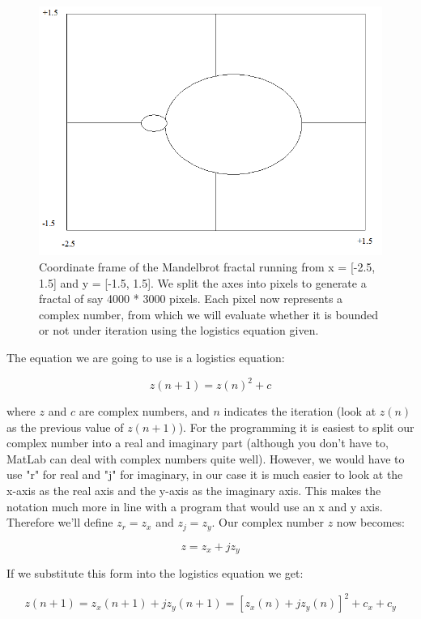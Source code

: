 \documentclass[12pt,letterpaper]{article}
\begin{document}
\begin{figure}
\centering
\includegraphics[width=0.7\linewidth]{HW_MandelbrotFractalCoordinates}
\caption{Coordinate frame of the Mandelbrot fractal running from x = [-2.5, 1.5] and y = [-1.5, 1.5]. We split the axes into pixels to generate a fractal of say 4000 * 3000 pixels. Each pixel now represents a complex number, from which we will evaluate whether it is bounded or not under iteration using the logistics equation given.}
\label{fig:HW_MandelbrotFractalCoordinates}
\end{figure}

The equation we are going to use is a logistics equation:

\begin{equation}\label{Eqn:HW_Mandelbrot1}
z(n+1) = z(n)^2 + c
\end{equation}

where $z$ and $c$ are complex numbers, and $n$ indicates the iteration (look at $z(n)$ as the previous value of $z(n+1)$). For the programming it is easiest to split our complex number into a real and imaginary part (although you don't have to, MatLab can deal with complex numbers quite well). However, we would have to use "r" for real and "j" for imaginary, in our case it is much easier to look at the x-axis as the real axis and the y-axis as the imaginary axis. This makes the notation much more in line with a program that would use an x and y axis. Therefore we'll define $z_r = z_x$ and $z_j = z_y$. Our complex number $z$ now becomes:



\begin{equation}\label{Eqn:HW_Mandelbrot2}
z = z_x + j z_y
\end{equation}

If we substitute this form into the logistics equation we get:

\begin{equation}\label{Eqn:HW_Mandelbrot3}
z(n+1) = z_x(n+1) + j z_y(n+1) = \left[ z_x(n) + j z_y(n) \right]^2 + c_x + c_y 
\end{equation}
\end{document}
